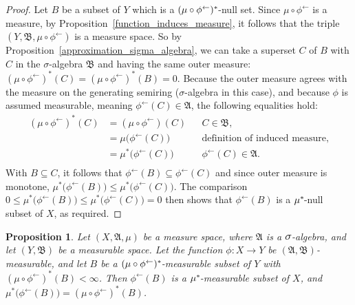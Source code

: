 \documentclass[
twoside=true,
paper=letter,
fontsize=11pt,
pagesize=auto,
leqno,
openany,
headsepline,
overfullrule,
]{scrbook}
\theoremstyle{plain}
\theoremstyle{plain}
\newtheorem{prop}[thm]{Proposition}
\theoremstyle{definition}
\theoremstyle{bfnoteitalic}
\theoremstyle{bfnoteroman}
\newcommand{\sigalg}[1]{\mathfrak{#1}}
\newcommand{\textsigma}{\hbox{\large{$\sigma$}}\kern-1pt}
\newcommand{\preimage}[1]{#1^{\leftarrow}}
\newcommand{\sigmaalgebra}{\sigalg{A}}
\newcommand{\sigmaalgebraii}{\sigalg{B}}
\newcommand{\kernast}{\ast\kern-1pt}
\newcommand{\measurespace}{X}
\newcommand{\measurespaceii}{Y}
\newcommand{\measure}{\mu}
\begin{document}
\begin{proof}
Let $B$ be a subset of $\measurespaceii$ which is a $(\measure\circ\preimage{\phi})^\kernast$-null set. Since $\measure\circ\preimage{\phi}$ is a measure, by Proposition~\ref{function_induces_measure}, it follows that
the triple $(\measurespaceii, \sigmaalgebraii, \measure\circ\preimage{\phi})$ is a measure space. So by Proposition~\ref{approximation_sigma_algebra}, we can take a superset $C$ of $B$ with $C$ in the \textsigma-algebra $\sigmaalgebraii$ and having the same outer measure: 
$(\measure\circ\preimage{\phi})^*(C) =
(\measure\circ\preimage{\phi})^*(B) =0$.
Because the outer measure agrees with the measure on the generating semiring (\textsigma-algebra in this case), and because $\phi$ is assumed measurable, meaning $\preimage{\phi}(C)\in\sigmaalgebra$, the following equalities hold:
\begin{align*}
(\measure\circ\preimage{\phi})^*(C)
& = (\measure\circ\preimage{\phi})(C)
&& \text{$C\in\sigmaalgebraii$,}
\\
& = \measure\bigl(\preimage{\phi}(C)\bigr)
&& \text{definition of induced measure,}
\\
& = \measure^*\bigl(\preimage{\phi}(C)\bigr)
&& \text{$\preimage{\phi}(C)\in\sigmaalgebra$.}
\\
\end{align*}
With $B\subseteq C$, it follows that $\preimage{\phi}(B)\subseteq\preimage{\phi}(C)$ and since outer measure is monotone, 
$\measure^*\bigl(\preimage{\phi}(B)\bigr)
\leq
\measure^*\bigl(\preimage{\phi}(C)\bigr)$. The comparison
$0 \leq \measure^*\bigl(\preimage{\phi}(B)\bigr)
\leq
\measure^*\bigl(\preimage{\phi}(C)\bigr) = 0$ then shows that $\preimage{\phi}(B)$ is a $\measure^\kernast$-null subset of $\measurespace$, as required.
\end{proof}


\begin{prop}\label{preimage_of_a_measurable_set}
Let $(\measurespace,\sigmaalgebra,\measure)$ be a measure space, where $\sigmaalgebra$ is a $\textsigma$-algebra, and let $(\measurespaceii, \sigmaalgebraii)$ be a measurable space.  Let the function $\phi:\measurespace\to\measurespaceii$ be $(\sigmaalgebra, \sigmaalgebraii)$\hyp{}measurable, and let  $B$ be a
$(\measure\circ\preimage{\phi})^\kernast$-measurable subset of $\measurespaceii$ with $(\measure\circ\preimage{\phi})^*(B)< \infty$.
Then $\preimage{\phi}(B)$ is a $\measure^\kernast$-measurable subset of $\measurespace$, and 
$\measure^*\bigl(\preimage{\phi}(B)\bigr) = (\measure\circ\preimage{\phi})^*(B)$. 
\end{prop}
\end{document}
